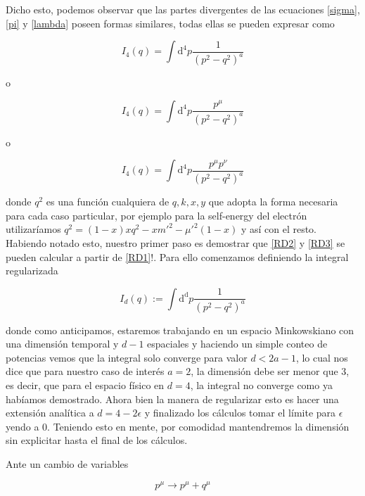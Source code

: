 \documentclass[tickz]{article}
\numberwithin{equation}{section}
\begin{document}
Dicho esto, podemos observar que las partes divergentes de las ecuaciones \ref{sigma}, \ref{pi} y \ref{lambda} poseen formas similares, todas ellas se pueden expresar como

\begin{equation}\label{RD1}
I_4(q)=\int\mathrm{d^4}p \frac{1}{\left(p^2 - q^2 \right)^a}
\end{equation}

o

\begin{equation}\label{RD2}
I_4(q)=\int\mathrm{d^4}p \frac{p^{\mu}}{\left(p^2 - q^2 \right)^a}
\end{equation}

o

\begin{equation}\label{RD3}
I_4(q)=\int\mathrm{d^4}p \frac{p^{\mu} p^{\nu}}{\left(p^2 - q^2 \right)^a}
\end{equation}

donde $ q^2 $ es una función cualquiera de $ q,k,x,y $ que adopta la forma necesaria para cada caso particular, por ejemplo para la self-energy del electrón utilizaríamos $ q^2 = (1-x)xq^{2}-xm'^{2}-\mu'^{2}(1-x) $ y así con el resto.  
Habiendo notado esto, nuestro primer paso es demostrar que \ref{RD2} y \ref{RD3} se pueden calcular a partir de \ref{RD1}!.
Para ello comenzamos definiendo la integral regularizada

\begin{equation}\label{RD4}
I_d(q):=\int\mathrm{d^d}p \frac{1}{\left(p^2 - q^2 \right)^a}
\end{equation}

donde como anticipamos, estaremos trabajando en un espacio Minkowskiano con una dimensión temporal y $ d-1 $ espaciales y haciendo un simple conteo de potencias vemos que la integral solo converge para valor $ d< 2a -1 $, lo cual nos dice que para nuestro caso de interés $ a=2 $, la dimensión debe ser menor que 3, es decir, que para el espacio físico en $ d=4 $, la integral no converge como ya habíamos demostrado. Ahora bien la manera de regularizar esto es hacer una extensión analítica a $ d= 4 -2\epsilon $ y finalizado los cálculos tomar el límite para $ \epsilon $ yendo a $ 0 $. Teniendo esto en mente, por comodidad mantendremos la dimensión sin explicitar hasta el final de los cálculos.

Ante un cambio de variables

\begin{equation}\label{RDtransf}
p^{\mu} \longrightarrow p^{\mu} + q^{\mu} 
\end{equation}
\end{document}
